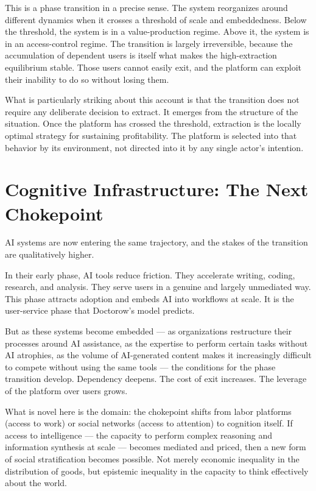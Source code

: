 \documentclass[12pt, a4paper]{article}
\begin{document}
This is a phase transition in a precise sense. The system reorganizes around
different dynamics when it crosses a threshold of scale and embeddedness. Below
the threshold, the system is in a value-production regime. Above it, the system
is in an access-control regime. The transition is largely irreversible, because
the accumulation of dependent users is itself what makes the high-extraction
equilibrium stable. Those users cannot easily exit, and the platform can exploit
their inability to do so without losing them.

What is particularly striking about this account is that the transition does
not require any deliberate decision to extract. It emerges from the structure
of the situation. Once the platform has crossed the threshold, extraction is
the locally optimal strategy for sustaining profitability. The platform is
selected into that behavior by its environment, not directed into it by any
single actor's intention.

\section{Cognitive Infrastructure: The Next Chokepoint}

AI systems are now entering the same trajectory, and the stakes of the
transition are qualitatively higher.

In their early phase, AI tools reduce friction. They accelerate writing,
coding, research, and analysis. They serve users in a genuine and largely
unmediated way. This phase attracts adoption and embeds AI into workflows at
scale. It is the user-service phase that Doctorow's model predicts.

But as these systems become embedded --- as organizations restructure their
processes around AI assistance, as the expertise to perform certain tasks
without AI atrophies, as the volume of AI-generated content makes it
increasingly difficult to compete without using the same tools --- the
conditions for the phase transition develop. Dependency deepens. The cost of
exit increases. The leverage of the platform over users grows.

What is novel here is the domain: the chokepoint shifts from labor platforms
(access to work) or social networks (access to attention) to cognition itself.
If access to intelligence --- the capacity to perform complex reasoning and
information synthesis at scale --- becomes mediated and priced, then a new
form of social stratification becomes possible. Not merely economic inequality
in the distribution of goods, but epistemic inequality in the capacity to
think effectively about the world.
\end{document}
